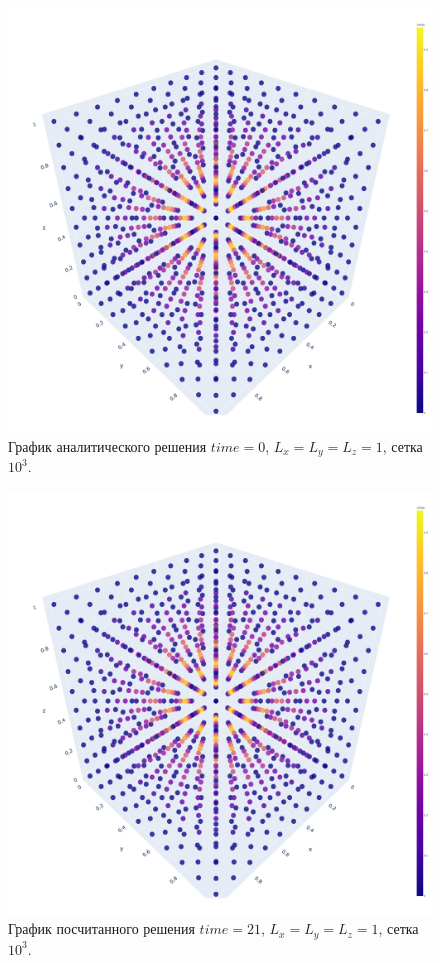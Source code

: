 \documentclass{article}
\begin{document}
\begin{figure}[!t]
\centering
    \includegraphics[width=\textwidth,trim=0 0 0 0,clip]{an_sol_hm.pdf}
    \caption{График аналитического решения \(time = 0\), \(L_x=L_y = L_z = 1\), сетка \(10^3\).}
    \label{img:1}
\end{figure}

\begin{figure}[!t]
\centering
    \includegraphics[width=\textwidth,trim=0 0 0 0,clip]{calc_sol_hm.pdf}
    \caption{График посчитанного решения \(time = 21\), \(L_x = L_y = L_z = 1\), сетка \(10^3\).}
    \label{img:2}
\end{figure}
\end{document}
